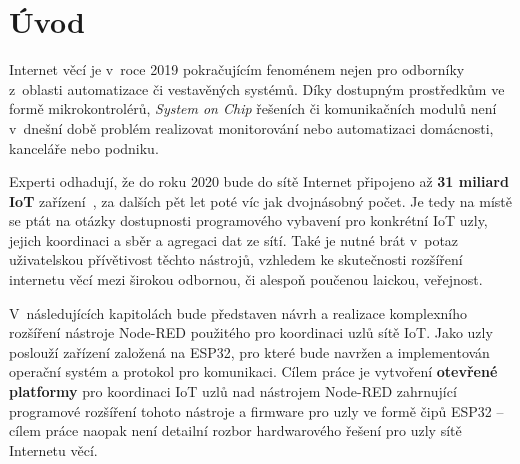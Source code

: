 \chapter{Úvod}
\label{ch:uvod}

Internet věcí je v~roce 2019 pokračujícím fenoménem nejen pro odborníky z~oblasti automatizace či vestavěných systémů.
Díky dostupným prostředkům ve formě mikrokontrolérů, \textit{System on Chip} řešeních či komunikačních modulů není
v~dnešní době problém realizovat monitorování nebo automatizaci domácnosti, kanceláře nebo podniku.

Experti odhadují, že do roku 2020 bude do sítě Internet připojeno až \textbf{31 miliard IoT}
zařízení~\cite{StatistaIoT, IoTTrends}, za dalších pět let poté víc jak dvojnásobný počet.
Je tedy na místě se ptát na otázky dostupnosti programového vybavení pro konkrétní IoT uzly, jejich koordinaci a sběr
a agregaci dat ze sítí.
Také je nutné brát v~potaz uživatelskou přívětivost těchto nástrojů, vzhledem ke
skutečnosti rozšíření internetu věcí mezi širokou odbornou, či alespoň poučenou laickou, veřejnost.

V~následujících kapitolách bude představen návrh a realizace komplexního rozšíření nástroje Node-RED použitého pro
koordinaci uzlů sítě IoT. Jako uzly poslouží zařízení založená na ESP32, pro které bude navržen a implementován
operační systém a protokol pro komunikaci.
Cílem práce je vytvoření \textbf{otevřené platformy} pro koordinaci IoT uzlů nad nástrojem Node-RED zahrnující
programové rozšíření tohoto nástroje a firmware pro uzly ve formě čipů ESP32 -- cílem práce naopak není
detailní rozbor hardwarového řešení pro uzly sítě Internetu věcí.

